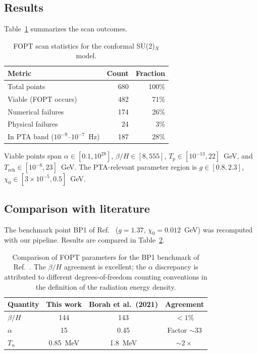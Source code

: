 \documentclass[12pt,a4paper]{article}
\begin{document}
\subsection{Results}

Table~\ref{tab:fopt_stats} summarizes the scan outcomes.

\begin{table}[h]
\centering
\begin{tabular}{lrr}
\toprule
Metric & Count & Fraction \\
\midrule
Total points & 680 & 100\% \\
Viable (FOPT occurs) & 482 & 71\% \\
Numerical failures & 174 & 26\% \\
Physical failures & 24 & 3\% \\
In PTA band ($10^{-9}$--$10^{-7}$~Hz) & 187 & 28\% \\
\bottomrule
\end{tabular}
\caption{FOPT scan statistics for the conformal SU(2)$_X$ model.}
\label{tab:fopt_stats}
\end{table}

Viable points span $\alpha \in [0.1, 10^{28}]$, $\beta/H \in [8, 555]$, $T_p \in [10^{-13}, 22]$~GeV, and $T_{\text{reh}} \in [10^{-6}, 23]$~GeV. The PTA-relevant parameter region is $g \in [0.8, 2.3]$, $\chi_0 \in [3\times10^{-5}, 0.5]$~GeV.

\subsection{Comparison with literature}

The benchmark point BP1 of Ref.~\cite{Borah:2021} ($g=1.37$, $\chi_0=0.012$~GeV) was recomputed with our pipeline. Results are compared in Table~\ref{tab:lit_compare}.

\begin{table}[h]
\centering
\begin{tabular}{lccc}
\toprule
Quantity & This work & Borah et al.\ (2021) & Agreement \\
\midrule
$\beta/H$ & 144 & 143 & $<1\%$ \\
$\alpha$ & 15 & 0.45 & Factor $\sim 33$ \\
$T_n$ & 0.85~MeV & 1.8~MeV & $\sim 2\times$ \\
\bottomrule
\end{tabular}
\caption{Comparison of FOPT parameters for the BP1 benchmark of Ref.~\cite{Borah:2021}. The $\beta/H$ agreement is excellent; the $\alpha$ discrepancy is attributed to different degrees-of-freedom counting conventions in the definition of the radiation energy density.}
\label{tab:lit_compare}
\end{table}
\end{document}
